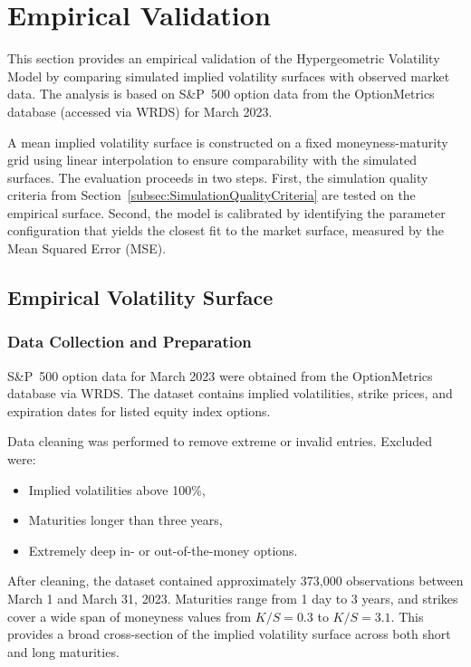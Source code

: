 \section{Empirical Validation} \label{sec:EmpiricalValidation}

This section provides an empirical validation of the Hypergeometric Volatility Model by comparing simulated implied volatility surfaces with observed market data. The analysis is based on S\&P~500 option data from the OptionMetrics database (accessed via WRDS) for March 2023.

A mean implied volatility surface is constructed on a fixed moneyness-maturity grid using linear interpolation to ensure comparability with the simulated surfaces. The evaluation proceeds in two steps. First, the simulation quality criteria from Section~\ref{subsec:SimulationQualityCriteria} are tested on the empirical surface. Second, the model is calibrated by identifying the parameter configuration that yields the closest fit to the market surface, measured by the Mean Squared Error (MSE).


\subsection{Empirical Volatility Surface} \label{subsec:EmpiricalVolatilitySurface}

\subsubsection*{Data Collection and Preparation}
S\&P~500 option data for March 2023 were obtained from the OptionMetrics database via WRDS. The dataset contains implied volatilities, strike prices, and expiration dates for listed equity index options.

Data cleaning was performed to remove extreme or invalid entries. Excluded were:
\begin{itemize}
    \item Implied volatilities above 100\%,
    \item Maturities longer than three years,
    \item Extremely deep in- or out-of-the-money options.
\end{itemize}
After cleaning, the dataset contained approximately 373{,}000 observations between March 1 and March 31, 2023. Maturities range from 1 day to 3 years, and strikes cover a wide span of moneyness values from $K/S = 0.3$ to $K/S = 3.1$. This provides a broad cross-section of the implied volatility surface across both short and long maturities.

